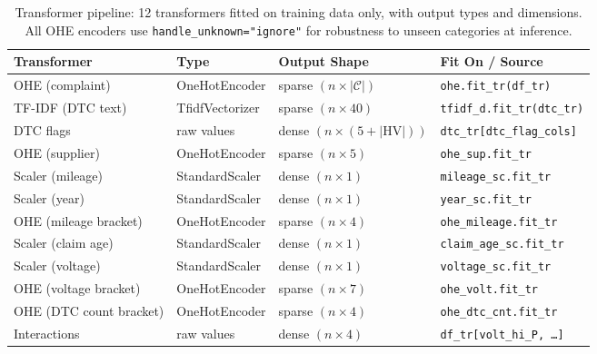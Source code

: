 \documentclass[10pt,a4paper]{article}
\begin{document}
\begin{table}[H]
\centering
\caption{Transformer pipeline: 12 transformers fitted on training data only, with output types and dimensions. All OHE encoders use \texttt{handle\_unknown="ignore"} for robustness to unseen categories at inference.}
\label{tab:transformer-pipeline}
\small
\begin{tabular}{llR{2.5cm}R{4cm}}
\toprule
\textbf{Transformer} & \textbf{Type} & \textbf{Output Shape} & \textbf{Fit On / Source} \\
\midrule
OHE (complaint)         & OneHotEncoder     & sparse $(n \times |\mathcal{C}|)$   & \texttt{ohe.fit\_tr(df\_tr)} \\
TF-IDF (DTC text)       & TfidfVectorizer   & sparse $(n \times 40)$              & \texttt{tfidf\_d.fit\_tr(dtc\_tr)} \\
DTC flags               & raw values        & dense $(n \times (5 + |\text{HV}|))$ & \texttt{dtc\_tr[dtc\_flag\_cols]} \\
OHE (supplier)          & OneHotEncoder     & sparse $(n \times 5)$               & \texttt{ohe\_sup.fit\_tr} \\
Scaler (mileage)        & StandardScaler    & dense $(n \times 1)$                 & \texttt{mileage\_sc.fit\_tr} \\
Scaler (year)           & StandardScaler    & dense $(n \times 1)$                 & \texttt{year\_sc.fit\_tr} \\
OHE (mileage bracket)   & OneHotEncoder     & sparse $(n \times 4)$               & \texttt{ohe\_mileage.fit\_tr} \\
Scaler (claim age)      & StandardScaler    & dense $(n \times 1)$                 & \texttt{claim\_age\_sc.fit\_tr} \\
Scaler (voltage)        & StandardScaler    & dense $(n \times 1)$                 & \texttt{voltage\_sc.fit\_tr} \\
OHE (voltage bracket)   & OneHotEncoder     & sparse $(n \times 7)$               & \texttt{ohe\_volt.fit\_tr} \\
OHE (DTC count bracket) & OneHotEncoder     & sparse $(n \times 4)$               & \texttt{ohe\_dtc\_cnt.fit\_tr} \\
Interactions            & raw values        & dense $(n \times 4)$                 & \texttt{df\_tr[volt\_hi\_P, \ldots]} \\
\bottomrule
\end{tabular}
\end{table}
\end{document}
